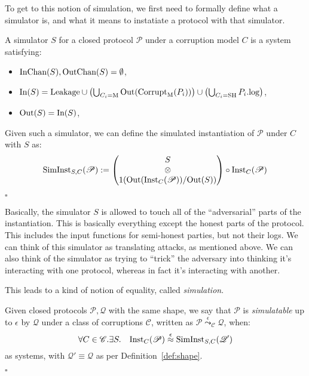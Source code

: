To get to this notion of simulation, we first need to formally
define what a simulator is, and what it means to instatiate
a protocol with that simulator.

\begin{definition}
  A simulator $S$ for a closed protocol $\mathscr{P}$ under a corruption
  model $C$ is a system satisfying:
  \begin{itemize}
    \item $\text{InChan}(S), \text{OutChan}(S) = \emptyset$,
    \item $\text{In}(S) = \text{Leakage} \cup \left(\bigcup_{C_i = \text{M}} \text{Out}(\text{Corrupt}_{\text{M}}(P_i))\right) \cup \left(\bigcup_{C_i = \text{SH}} P_i.\text{log}\right)$,
    \item $\text{Out}(S) = \text{In}(S)$,
  \end{itemize}

  Given such a simulator, we can define the simulated instantiation
  of $\mathscr{P}$ under $C$ with $S$ as:
  $$
  \text{SimInst}_{S, C}(\mathscr{P}) := 
  \begin{pmatrix}
    S\cr
    \otimes\cr
    1(\text{Out}(\text{Inst}_C(\mathscr{P})) / \text{Out}(S))
  \end{pmatrix}
  \circ \text{Inst}_C(\mathscr{P})
  $$

  $\square$
\end{definition}

Basically, the simulator $S$ is allowed to touch all of the
``adversarial'' parts of the instantiation.
This is basically everything except the honest parts
of the protocol.
This includes the input functions for semi-honest parties,
but not their logs.
We can think of this simulator as translating attacks, as mentioned above.
We can also think of the simulator as trying to ``trick''
the adversary into thinking it's interacting
with one protocol, whereas in fact it's interacting with another.

This leads to a kind of notion of equality, called
\emph{simulation}.

\begin{definition}[Simulatability]
  Given closed protocols $\mathscr{P}, \mathscr{Q}$ with the same shape,
  we say that $\mathscr{P}$ is \emph{simulatable} up to $\epsilon$ by $\mathscr{Q}$
  under a class of corruptions $\mathscr{C}$,
  written as $\mathscr{P} \overset{\epsilon}{\leadsto}_{\mathscr{C}} \mathscr{Q}$,
  when:
  $$
  \forall C \in \mathscr{C}.\exists S.\quad \text{Inst}_C(\mathscr{P}) \overset{\epsilon}{\approx} \text{SimInst}_{S, C}(\mathscr{Q}')
  $$
  as systems, with $\mathscr{Q}' \equiv \mathscr{Q}$ as per 
  Definition~\ref{def:shape}.

  $\square$
\end{definition}

